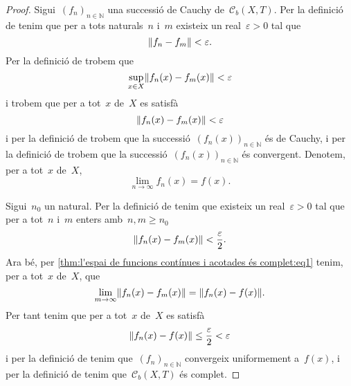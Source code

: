 \documentclass[../../main.tex]{subfiles}
\begin{document}
    \begin{proof}
        Sigui~\((f_{n})_{n\in\mathbb{N}}\) una successió de Cauchy de~\(\mathcal{C}_{b}(X,T)\).
        Per la definició de  tenim que per a tots naturals~\(n\) i~\(m\) existeix un real~\(\varepsilon>0\) tal que
        \[
            \norm{f_{n}-f_{m}}<\varepsilon.
        \]
        Per la definició de  trobem que
        \[
            \sup_{x\in X}\norm{f_{n}(x)-f_{m}(x)}<\varepsilon
        \]
        i trobem que per a tot~\(x\) de~\(X\) es satisfà
        \[
            \norm{f_{n}(x)-f_{m}(x)}<\varepsilon
        \]
        i per la definició de  trobem que la successió~\((f_{n}(x))_{n\in\mathbb{N}}\) és de Cauchy, i per la definició de  trobem que la successió~\((f_{n}(x))_{n\in\mathbb{N}}\) és convergent.
        Denotem, per a tot~\(x\) de~\(X\),
        \begin{equation}
            \label{thm:l'espai de funcions contínues i acotades és complet:eq1}
            \lim_{n\to\infty}f_{n}(x)=f(x).
        \end{equation}

        Sigui~\(n_{0}\) un natural.
        Per la definició de  tenim que existeix un real~\(\varepsilon>0\) tal que per a tot~\(n\) i~\(m\) enters amb~\(n,m\geq n_{0}\)
        \[
            \norm{f_{n}(x)-f_{m}(x)}<\frac{\varepsilon}{2}.
        \]
        Ara bé, per \eqref{thm:l'espai de funcions contínues i acotades és complet:eq1} tenim, per a tot~\(x\) de~\(X\), que
        \[
            \lim_{m\to\infty}\norm{f_{n}(x)-f_{m}(x)}=\norm{f_{n}(x)-f(x)}.
        \]
        Per tant tenim que per a tot~\(x\) de~\(X\) es satisfà
        \[
            \norm{f_{n}(x)-f(x)}\leq\frac{\varepsilon}{2}<\varepsilon
        \]
        i per la definició de  tenim que~\((f_{n})_{n\in\mathbb{N}}\) convergeix uniformement a~\(f(x)\), i per la definició de  tenim que~\(\mathcal{C}_{b}(X,T)\) és complet.
    \end{proof}
\end{document}
